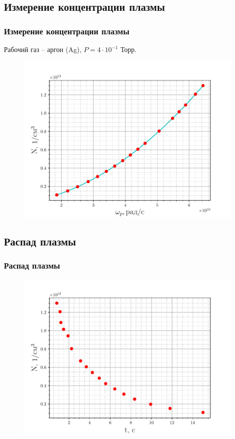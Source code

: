 \documentclass[10pt,pdf,hyperref={unicode}, dvipsnames]{beamer}
\begin{document}
\begin{frame}
\subsection{Измерение концентрации плазмы}
\begin{frame}
	\frametitle{Измерение концентрации плазмы}
	Рабочий газ -- аргон (Ag), 
	$P=4\cdot10^{-1}$ Торр. 
	\begin{figure}[tb]
		\vspace{-5pt}
		\centering
		\includegraphics[width=0.89\linewidth]{fig/concentration}
		\label{fig:1}
	\end{figure}
\end{frame}
\subsection{Распад  плазмы}
\begin{frame}
	\frametitle{Распад плазмы}
	\begin{figure}[tb]
		\centering
		\includegraphics[width=0.9\linewidth]{fig/decay}
		\label{fig:2}
	\end{figure}
\end{frame}


\end{frame}
\end{document}
